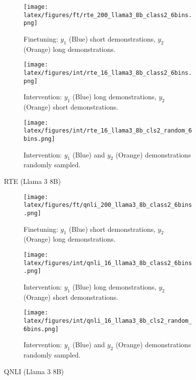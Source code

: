\begin{figure*}[t!]
    \centering
    \begin{minipage}[t]{\linewidth}
        \begin{subfigure}{0.31\linewidth}
            \centering
            \texttt{[image: latex/figures/ft/rte\_200\_llama3\_8b\_class2\_6bins.png]}
            \caption{Finetuning: $y_1$ (Blue) short demonstrations, $y_2$ (Orange) long demonstrations.}
        \end{subfigure}%
        \hfill
        \begin{subfigure}{0.31\linewidth}
            \centering
            \texttt{[image: latex/figures/int/rte\_16\_llama3\_8b\_class2\_6bins.png]}
            \caption{Intervention: $y_1$ (Blue) long demonstrations, $y_2$ (Orange) short demonstrations.}
        \end{subfigure}
        \hfill
        \begin{subfigure}{0.31\linewidth}
            \centering
            \texttt{[image: latex/figures/int/rte\_16\_llama3\_8b\_cls2\_random\_6bins.png]}
            \caption{Intervention: $y_1$ (Blue) and $y_2$ (Orange) demonstrations randomly sampled.}
        \end{subfigure}
    \end{minipage}%
    \hfill
    \begin{minipage}[c]{\linewidth}
        \caption{RTE (Llama 3 8B)}
    \end{minipage}
\end{figure*}

\begin{figure*}[t!]
    \centering
    \begin{minipage}[t]{\linewidth}
        \begin{subfigure}{0.31\linewidth}
            \centering
            \texttt{[image: latex/figures/ft/qnli\_200\_llama3\_8b\_class2\_6bins.png]}
            \caption{Finetuning: $y_1$ (Blue) short demonstrations, $y_2$ (Orange) long demonstrations.}
        \end{subfigure}%
        \hfill
        \begin{subfigure}{0.31\linewidth}
            \centering
            \texttt{[image: latex/figures/int/qnli\_16\_llama3\_8b\_class2\_6bins.png]}
            \caption{Intervention: $y_1$ (Blue) long demonstrations, $y_2$ (Orange) short demonstrations.}
        \end{subfigure}
        \hfill
        \begin{subfigure}{0.31\linewidth}
            \centering
            \texttt{[image: latex/figures/int/qnli\_16\_llama3\_8b\_cls2\_random\_6bins.png]}
            \caption{Intervention: $y_1$ (Blue) and $y_2$ (Orange) demonstrations randomly sampled.}
        \end{subfigure}
    \end{minipage}%
    \hfill
    \begin{minipage}[c]{\linewidth}
        \caption{QNLI (Llama 3 8B)}
    \end{minipage}
\end{figure*}

